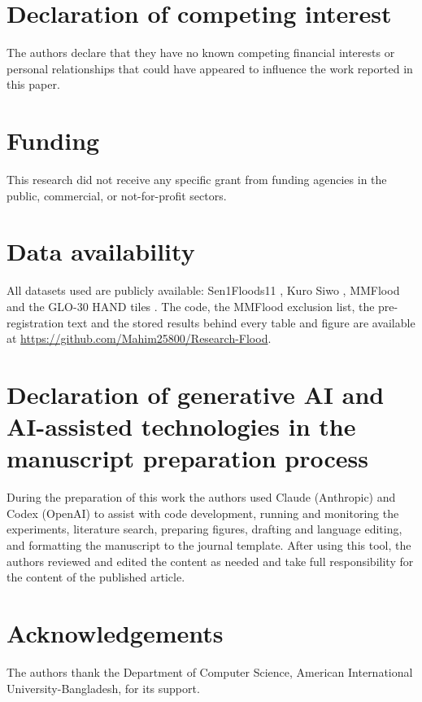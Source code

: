 \documentclass[a4paper,fleqn]{cas-sc}
\begin{document}
\section*{Declaration of competing interest}
The authors declare that they have no known competing financial interests or personal relationships that could have appeared to influence the work reported in this paper.

\section*{Funding}
This research did not receive any specific grant from funding agencies in the public, commercial, or not-for-profit sectors.

\section*{Data availability}
All datasets used are publicly available: Sen1Floods11 \citep{bonafilia2020sen1floods11}, Kuro Siwo \citep{bountos2024kurosiwo}, MMFlood \citep{montello2022mmflood} and the GLO-30 HAND tiles \citep{glo30hand2022}. The code, the MMFlood exclusion list, the pre-registration text and the stored results behind every table and figure are available at \url{https://github.com/Mahim25800/Research-Flood}.

\section*{Declaration of generative AI and AI-assisted technologies in the manuscript preparation process}
During the preparation of this work the authors used Claude (Anthropic) and Codex (OpenAI) to assist with code development, running and monitoring the experiments, literature search, preparing figures, drafting and language editing, and formatting the manuscript to the journal template. After using this tool, the authors reviewed and edited the content as needed and take full responsibility for the content of the published article.

\section*{Acknowledgements}
The authors thank the Department of Computer Science, American International University-Bangladesh, for its support.
\end{document}
